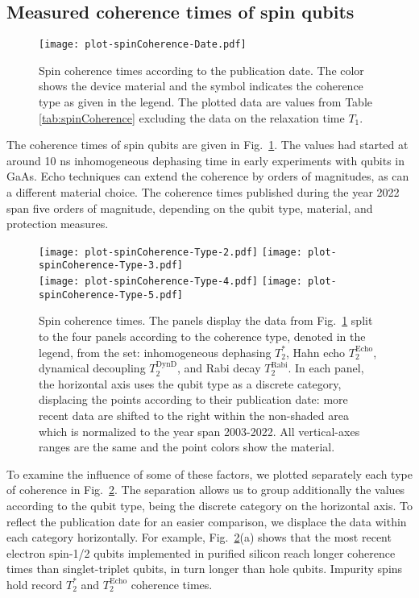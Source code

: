 \documentclass[aps, prx, showpacs, twocolumn, superscriptaddress, notitlepage, longbibliography, floatfix, nofootinbib]{revtex4-2}
\newcommand{\TRabi}{T_2^\mathrm{Rabi}}
\newcommand{\TEcho}{T_2^\mathrm{Echo}}
\newcommand{\TDynD}{T_2^\mathrm{DynD}}
\newcommand{\recheck}[1]{{#1}}
\begin{document}
\subsection{Measured coherence times of spin qubits}

\begin{figure}
  \texttt{[image: plot-spinCoherence-Date.pdf]}
  \caption{
  \label{fig:spinPhaseCoherenceAll}
  Spin coherence times according to the publication date. The color shows the device material and the symbol indicates the coherence type as given in the legend. The plotted data are values from Table \ref{tab:spinCoherence} excluding the data on the relaxation time $T_1$. 
  }
\end{figure}

The coherence times of spin qubits are given in Fig.~\ref{fig:spinPhaseCoherenceAll}. The values had started at around 10 ns inhomogeneous dephasing time in early experiments with qubits in GaAs. Echo techniques can extend the coherence by orders of magnitudes, as can a different material choice. \recheck{The coherence times published during the year 2022 span five orders of magnitude, depending on the qubit type, material, and protection measures.}

\begin{figure}
  \texttt{[image: plot-spinCoherence-Type-2.pdf]}
  \texttt{[image: plot-spinCoherence-Type-3.pdf]}\hfill \\
  \texttt{[image: plot-spinCoherence-Type-4.pdf]} \hfill
  \texttt{[image: plot-spinCoherence-Type-5.pdf]}
  \caption{
  \label{fig:spinPhaseCoherenceSubplots}
  Spin coherence times. The panels display the data from Fig.~\ref{fig:spinPhaseCoherenceAll} split to the four panels according to the coherence type, denoted in the legend, from the set: inhomogeneous dephasing $T_2^*$, Hahn echo $\TEcho$, dynamical decoupling $\TDynD$, and Rabi decay $\TRabi$. In each panel, the horizontal axis uses the qubit type as a discrete category, displacing the points according to their publication date: more recent data are shifted to the right within the non-shaded area which is \recheck{normalized to the year span 2003-2022}. All vertical-axes ranges are the same and the point colors show the material.
  }
\end{figure}



To examine the influence of some of these factors, we plotted separately each type of coherence in Fig.~\ref{fig:spinPhaseCoherenceSubplots}. The separation allows us to group additionally the values according to the qubit type, being the discrete category on the horizontal axis. To reflect the publication date for an easier comparison, we displace the data within each category horizontally. \recheck{For example, Fig.~\ref{fig:spinPhaseCoherenceSubplots}(a) shows that the most recent electron spin-1/2 qubits implemented in purified silicon reach longer coherence times than singlet-triplet qubits, in turn longer than hole qubits}. \recheck{Impurity spins hold record $T_2^*$ and $\TEcho$ coherence times.} 
\end{document}
